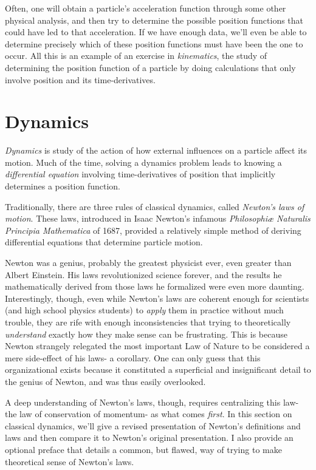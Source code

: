 \documentclass{article}
\begin{document}
Often, one will obtain a particle's acceleration function through some other physical analysis\footnotemark, and then try to determine the possible position functions that could have led to that acceleration. If we have enough data, we'll even be able to determine precisely which of these position functions must have been the one to occur. All this is an example of an exercise in \textit{kinematics}, the study of determining the position function of a particle by doing calculations that only involve position and its time-derivatives.


\newpage

\section*{Dynamics}

\textit{Dynamics} is study of the action of how external influences on a particle affect its motion. Much of the time, solving a dynamics problem leads to knowing a \textit{differential equation} involving time-derivatives of position that implicitly determines a position function.

Traditionally, there are three rules of classical dynamics, called \textit{Newton's laws of motion}. These laws, introduced in Isaac Newton's infamous \textit{Philosophiæ Naturalis Principia Mathematica} of 1687, provided a relatively simple method of deriving differential equations that determine particle motion.

Newton was a genius, probably the greatest physicist ever, even greater than Albert Einstein. His laws revolutionized science forever, and the results he mathematically derived from those laws he formalized were even more daunting. Interestingly, though, even while Newton's laws are coherent enough for scientists (and high school physics students) to \textit{apply} them in practice without much trouble, they are rife with enough inconsistencies that trying to theoretically \textit{understand} exactly how they make sense can be frustrating. This is because Newton strangely relegated the most important Law of Nature to be considered a mere side-effect of his laws- a corollary. One can only guess that this organizational exists because it constituted a superficial and insignificant detail to the genius of Newton, and was thus easily overlooked.

A deep understanding of Newton's laws, though, requires centralizing this law- the law of conservation of momentum- as what comes \textit{first}. In this section on classical dynamics, we'll give a revised presentation of Newton's definitions and laws and then compare it to Newton's original presentation. I also provide an optional preface that details a common, but flawed, way of trying to make theoretical sense of Newton's laws.
\end{document}
